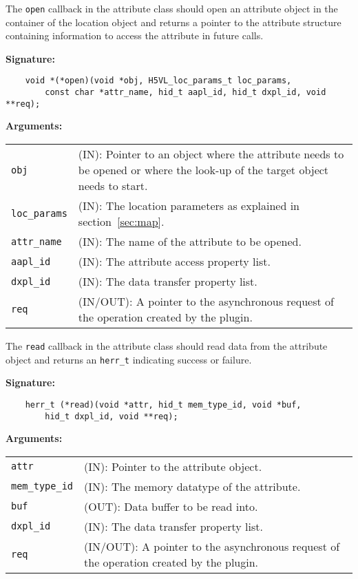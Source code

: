 The {\tt open} callback in the attribute class should open an
attribute object in the container of the location object and returns a
pointer to the attribute structure containing information to access
the attribute in future calls. 

\textbf{Signature:}
\begin{lstlisting}
    void *(*open)(void *obj, H5VL_loc_params_t loc_params, 
        const char *attr_name, hid_t aapl_id, hid_t dxpl_id, void **req);
\end{lstlisting}

\textbf{Arguments:}\\
\begin{tabular}{l p{10cm}}
  {\tt obj} & (IN): Pointer to an object where the attribute needs to be
  opened or where the look-up of the target object needs to start.\\
  {\tt loc\_params} & (IN): The location parameters as explained in
  section~\ref{sec:map}.\\
  {\tt attr\_name} & (IN): The name of the attribute to be opened.\\
  {\tt aapl\_id} & (IN): The attribute access property list.\\
  {\tt dxpl\_id} & (IN): The data transfer property list.\\
  {\tt req} & (IN/OUT): A pointer to the asynchronous request of the
  operation created by the plugin.\\
\end{tabular}

The {\tt read} callback in the attribute class should read data from
the attribute object and returns an {\tt herr\_t} indicating success or
failure.

\textbf{Signature:}
\begin{lstlisting}
    herr_t (*read)(void *attr, hid_t mem_type_id, void *buf, 
        hid_t dxpl_id, void **req);
\end{lstlisting}

\textbf{Arguments:}\\
\begin{tabular}{l p{10cm}}
  {\tt attr} & (IN): Pointer to the attribute object.\\
  {\tt mem\_type\_id} & (IN): The memory datatype of the attribute.\\
  {\tt buf} & (OUT): Data buffer to be read into.\\
  {\tt dxpl\_id} & (IN): The data transfer property list.\\
  {\tt req} & (IN/OUT): A pointer to the asynchronous request of the
  operation created by the plugin.\\
\end{tabular}

